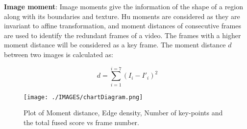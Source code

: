 \documentclass[journal]{IEEEtran}
\begin{document}
\textbf{Image moment}: Image moments give the information of the shape of a region along with its boundaries and texture. Hu moments \cite{hu1962visual} are considered as they are invariant to affine transformation, and moment distances of consecutive frames are used to identify the redundant frames of a video.  
The frames with a higher moment distance will be considered as a key frame. The moment distance $d$ between two images is calculated as:

\begin{equation}
d=\sum_{i=1}^{i=7}{(I_{i}-I'_{i})^2}
\end{equation}

\begin{figure}[t]
\centering     %
\texttt{[image: ./IMAGES/chartDiagram.png]}
\caption{Plot of Moment distance, Edge density, Number of key-points and the total fused score vs frame number.}
\label{Fig:chart}
\end{figure}
\end{document}

